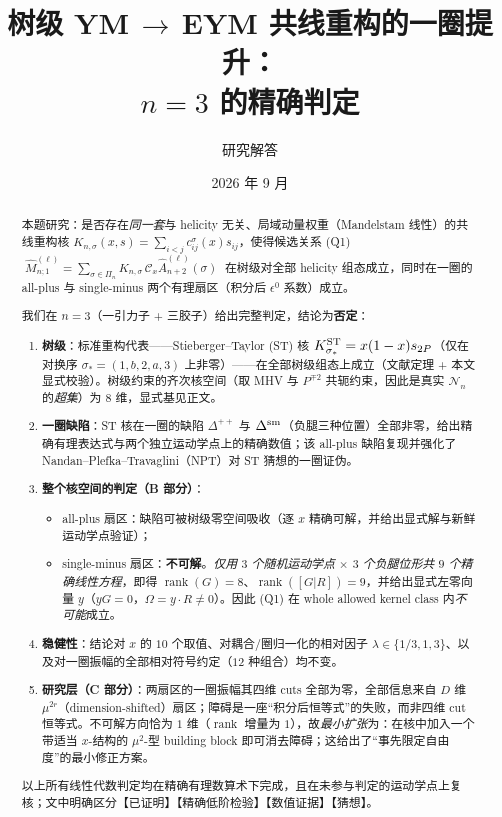 \documentclass[11pt]{article}
\title{\bfseries 树级 YM\,$\to$\,EYM 共线重构的一圈提升：\\[2mm] $n=3$ 的精确判定}
\author{研究解答}
\date{2026 年 9 月}
\newcommand{\Cx}{\mathcal{C}_x}
\newcommand{\Nn}{\mathcal{N}_n}
\newcommand{\Mhat}{\widehat{M}}
\newcommand{\Ahat}{\widehat{A}}
\begin{document}
\maketitle

\begin{abstract}
本题研究：是否存在\emph{同一套}与 helicity 无关、局域动量权重（Mandelstam 线性）的共线重构核
$K_{n,\sigma}(x,s)=\sum_{i<j}c^\sigma_{ij}(x)s_{ij}$，使得候选关系 (Q1)
$\;\Mhat^{(\ell)}_{n;1}=\sum_{\sigma\in\Pi_n}K_{n,\sigma}\,\Cx \Ahat^{(\ell)}_{n+2}(\sigma)\;$
在树级对全部 helicity 组态成立，同时在一圈的 all-plus 与 single-minus 两个有理扇区（积分后 $\epsilon^0$ 系数）成立。

我们在 $n=3$（一引力子 + 三胶子）给出完整判定，结论为\textbf{否定}：

\begin{enumerate}
\item \textbf{树级}：标准重构代表——Stieberger--Taylor (ST) 核
$K^{\rm ST}_{\sigma_*}=x(1-x)s_{2P}$（仅在对换序 $\sigma_*=(1,b,2,a,3)$ 上非零）——在全部树级组态上成立（文献定理 + 本文显式校验）。树级约束的齐次核空间（取 MHV 与 $P^{\mp2}$ 共轭约束，因此是真实 $\Nn$ 的\emph{超集}）为 $8$ 维，显式基见正文。
\item \textbf{一圈缺陷}：ST 核在一圈的缺陷
$\Delta^{++}$ 与 $\Delta^{\rm sm}$（负腿三种位置）全部非零，给出精确有理表达式与两个独立运动学点上的精确数值；该 all-plus 缺陷复现并强化了 Nandan--Plefka--Travaglini（NPT）对 ST 猜想的一圈证伪。
\item \textbf{整个核空间的判定（B 部分）}：
  \begin{itemize}
  \item all-plus 扇区：缺陷可被树级零空间吸收（逐 $x$ 精确可解，并给出显式解与新鲜运动学点验证）；
  \item single-minus 扇区：\textbf{不可解}。\emph{仅用 $3$ 个随机运动学点 $\times$ $3$ 个负腿位形共 $9$ 个精确线性方程}，即得 $\operatorname{rank}(G)=8$、$\operatorname{rank}([G|R])=9$，并给出显式左零向量 $y$（$yG=0$，$\Omega=y\!\cdot\!R\neq0$）。因此 (Q1) 在 whole allowed kernel class 内\emph{不可能}成立。
  \end{itemize}
\item \textbf{稳健性}：结论对 $x$ 的 $10$ 个取值、对耦合/圈归一化的相对因子 $\lambda\in\{1/3,1,3\}$、以及对一圈振幅的全部相对符号约定（$12$ 种组合）均不变。
\item \textbf{研究层（C 部分）}：两扇区的一圈振幅其四维 cuts 全部为零，全部信息来自 $D$ 维 $\mu^{2r}$（dimension-shifted）扇区；障碍是一座“积分后恒等式”的失败，而非四维 cut 恒等式。不可解方向恰为 $1$ 维（$\operatorname{rank}$ 增量为 $1$），故\emph{最小扩张}为：在核中加入一个带适当 $x$-结构的 $\mu^{2}$-型 building block 即可消去障碍；这给出了“事先限定自由度”的最小修正方案。
\end{enumerate}

以上所有线性代数判定均在精确有理数算术下完成，且在未参与判定的运动学点上复核；文中明确区分【已证明】【精确低阶检验】【数值证据】【猜想】。
\end{abstract}
\end{document}
